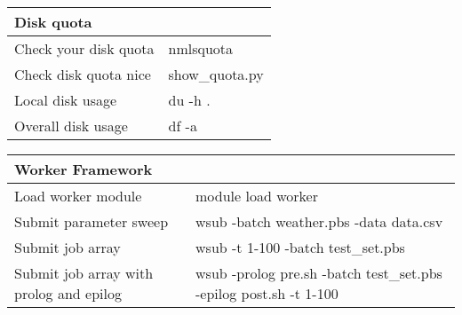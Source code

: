 \begin{tabular}{|p{1.3in}|p{2.6in}|} \hline
\multicolumn{2}{|p{1in}|}{\textbf{Disk quota}} \\ \hline
Check your disk quota & nmlsquota \\ \hline
Check disk quota nice & show\_quota.py \\ \hline
Local disk usage & du  -h  . \\ \hline
Overall disk usage & df -a \\ \hline
\end{tabular}

\begin{tabular}{|p{1.3in}|p{2.6in}|} \hline
\multicolumn{2}{|p{1in}|}{\textbf{Worker Framework}} \\ \hline
Load worker module & module load worker \\ \hline
Submit parameter sweep & wsub   -batch  weather.pbs   -data  data.csv \\ \hline
Submit job array & wsub  -t  1-100  -batch  test\_set.pbs \\ \hline
Submit job array with prolog and epilog & wsub  -prolog pre.sh  -batch test\_set.pbs  -epilog post.sh -t 1-100 \\ \hline
\end{tabular}
